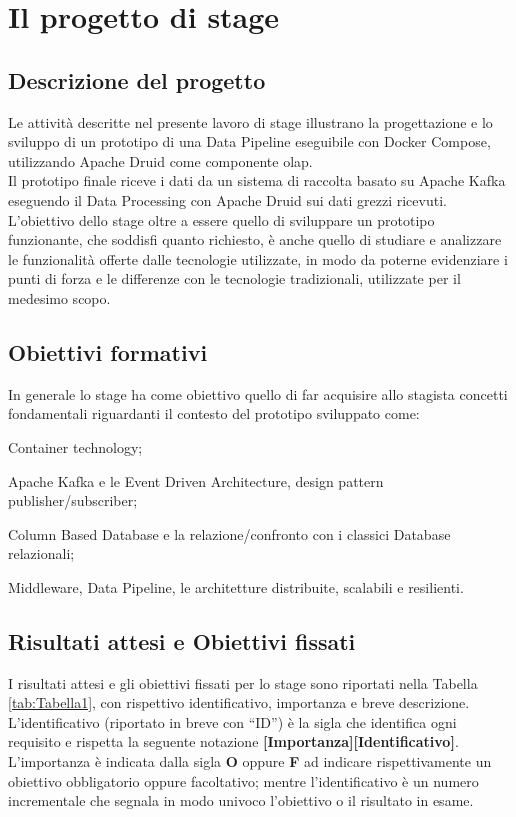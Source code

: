 \section{Il progetto di stage}
\subsection{Descrizione del progetto}
Le attività descritte nel presente lavoro di stage illustrano la progettazione e lo sviluppo di un prototipo di una \gls{Data Pipeline}{} eseguibile
con Docker Compose, utilizzando Apache Druid come componente \gls{olap}{}.\\
Il prototipo finale riceve i dati da un sistema di raccolta basato su Apache Kafka eseguendo il \gls{Data Processing}{} con Apache Druid sui dati grezzi ricevuti.\\
L'obiettivo dello stage oltre a essere quello di sviluppare un prototipo funzionante, che soddisfi quanto richiesto, è anche quello di studiare e analizzare le funzionalità offerte dalle tecnologie utilizzate, in modo da poterne evidenziare i punti di forza e 
le differenze con le tecnologie tradizionali, utilizzate per il medesimo scopo. \\
\subsection{Obiettivi formativi}
In generale lo stage ha come obiettivo quello di far acquisire allo stagista concetti fondamentali riguardanti il contesto del prototipo sviluppato come: 
\begin{list}{*}{}
    \item Container technology;
    \item Apache Kafka e le Event Driven Architecture, design pattern publisher/subscriber;
    \item Column Based Database e la relazione/confronto con i classici Database relazionali;
    \item \gls{Middleware}{}, \gls{Data Pipeline}{}, le architetture distribuite, scalabili e resilienti.
\end{list}
\subsection{Risultati attesi e Obiettivi fissati}\label{sec:obiettivi}
I risultati attesi e gli obiettivi fissati per lo stage sono riportati nella Tabella \ref{tab:Tabella1}, con rispettivo identificativo, importanza e breve descrizione.
\\L'identificativo (riportato in breve con “ID”) è la sigla che identifica ogni requisito e rispetta la seguente notazione \textbf{[Importanza][Identificativo]}. \\
L’importanza è indicata dalla sigla \textbf{O} oppure \textbf{F} ad indicare rispettivamente un obiettivo
obbligatorio oppure facoltativo; mentre l’identificativo è un numero incrementale che
segnala in modo univoco l’obiettivo o il risultato in esame.\\


